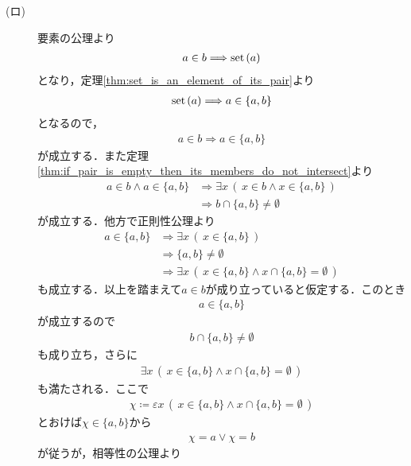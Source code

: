 \begin{prf}
\begin{description}
			\item[(ロ)]
				要素の公理より
				\begin{align}
					a \in b \Longrightarrow \operatorname*{set}\hspace{0.15em}(a)
				\end{align}
				となり，定理\ref{thm:set_is_an_element_of_its_pair}より
				\begin{align}
					\operatorname*{set}\hspace{0.15em}(a) \Longrightarrow a \in \{a,b\}
				\end{align}
				となるので，
				\begin{align}
					a \in b \Longrightarrow a \in \{a,b\}
				\end{align}
				が成立する．また定理\ref{thm:if_pair_is_empty_then_its_members_do_not_intersect}より
				\begin{align}
					a \in b \wedge a \in \{a,b\} 
					&\Longrightarrow \exists x\, \left(\, x \in b \wedge x \in \{a,b\}\, \right) \\
					&\Longrightarrow b \cap \{a,b\} \neq \emptyset
				\end{align}
				が成立する．他方で正則性公理より
				\begin{align}
					a \in \{a,b\} &\Longrightarrow \exists x\, \left(\, x \in \{a,b\}\, \right) \\
					&\Longrightarrow \{a,b\} \neq \emptyset \\
					&\Longrightarrow \exists x\, \left(\, x \in \{a,b\} \wedge x \cap \{a,b\} = \emptyset\, \right)
				\end{align}
				も成立する．以上を踏まえて$a \in b$が成り立っていると仮定する．このとき
				\begin{align}
					a \in \{a,b\}
				\end{align}
				が成立するので
				\begin{align}
					b \cap \{a,b\} \neq \emptyset
				\end{align}
				も成り立ち，さらに
				\begin{align}
					\exists x\, \left(\, x \in \{a,b\} \wedge x \cap \{a,b\} = \emptyset\, \right)
				\end{align}
				も満たされる．ここで
				\begin{align}
					\chi \coloneqq \varepsilon x\, \left(\, x \in \{a,b\} \wedge x \cap \{a,b\} = \emptyset\, \right)
				\end{align}
				とおけば$\chi \in \{a,b\}$から
				\begin{align}
					\chi = a \vee \chi = b
				\end{align}
				が従うが，相等性の公理より
				\begin{align}

\end{align}
\end{description}
\end{prf}
